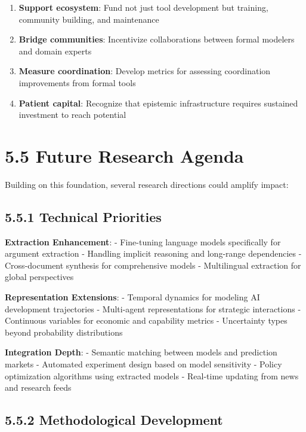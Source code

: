 \documentclass[
  11pt,
  letterpaper,
]{book}
\begin{document}
\begin{enumerate}
\def\labelenumi{\arabic{enumi}.}
\item
  \textbf{Support ecosystem}: Fund not just tool development but
  training, community building, and maintenance
\item
  \textbf{Bridge communities}: Incentivize collaborations between formal
  modelers and domain experts
\item
  \textbf{Measure coordination}: Develop metrics for assessing
  coordination improvements from formal tools
\item
  \textbf{Patient capital}: Recognize that epistemic infrastructure
  requires sustained investment to reach potential
\end{enumerate}

\section*{5.5 Future Research Agenda}\label{sec-future-research-agenda}


Building on this foundation, several research directions could amplify
impact:

\subsection*{5.5.1 Technical Priorities}\label{sec-technical-priorities}

\textbf{Extraction Enhancement}: - Fine-tuning language models
specifically for argument extraction - Handling implicit reasoning and
long-range dependencies - Cross-document synthesis for comprehensive
models - Multilingual extraction for global perspectives

\textbf{Representation Extensions}: - Temporal dynamics for modeling AI
development trajectories - Multi-agent representations for strategic
interactions - Continuous variables for economic and capability metrics
- Uncertainty types beyond probability distributions

\textbf{Integration Depth}: - Semantic matching between models and
prediction markets - Automated experiment design based on model
sensitivity - Policy optimization algorithms using extracted models -
Real-time updating from news and research feeds

\subsection*{5.5.2 Methodological
Development}\label{sec-methodological-development}
\end{document}
